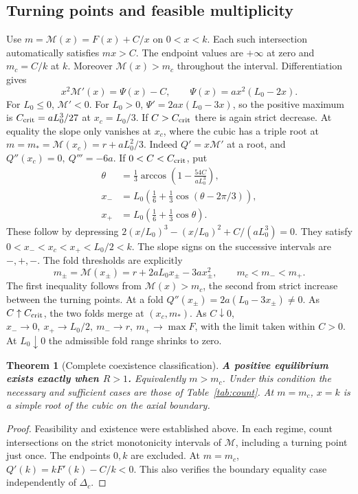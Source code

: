 \documentclass[12pt,a4paper,twoside,fleqn]{article}
\theoremstyle{journal}
\newtheorem{theorem}{Theorem}
\newcommand{\claim}[1]{{\normalfont\bfseries\boldmath #1}}
\begin{document}
\subsection{Turning points and feasible multiplicity}
Use \(m=\mathcal M(x)=F(x)+C/x\) on \(0<x<k\). Each such intersection automatically satisfies \(mx>C\). The endpoint values are \(+\infty\) at zero and \(m_c=C/k\) at \(k\). Moreover \(\mathcal M(x)>m_c\) throughout the interval. Differentiation gives
\[
 x^2\mathcal M'(x)=\Psi(x)-C,\qquad \Psi(x)=ax^2(L_0-2x).
\]
For \(L_0\le0\), \(\mathcal M'<0\). For \(L_0>0\), \(\Psi'=2ax(L_0-3x)\), so the positive maximum is \(C_{\rm crit}=aL_0^3/27\) at \(x_c=L_0/3\). If \(C>C_{\rm crit}\) there is again strict decrease. At equality the slope only vanishes at \(x_c\), where the cubic has a triple root at \(m=m_*=\mathcal M(x_c)=r+aL_0^2/3\). Indeed \(Q'=x\mathcal M'\) at a root, and \(Q''(x_c)=0,\ Q'''=-6a\). If \(0<C<C_{\rm crit}\), put
\[
 \begin{aligned}
 \theta&=\tfrac13\arccos\!\left(1-\frac{54C}{aL_0^3}\right),\\
 x_-&=L_0\left(\tfrac16+\tfrac13\cos(\theta-2\pi/3)\right),\\
 x_+&=L_0\left(\tfrac16+\tfrac13\cos\theta\right).
 \end{aligned}
\]
These follow by depressing \(2(x/L_0)^3-(x/L_0)^2+C/(aL_0^3)=0\). They satisfy \(0<x_-<x_c<x_+<L_0/2<k\). The slope signs on the successive intervals are \(-,+,-\). The fold thresholds are explicitly
\[
 m_\pm=\mathcal M(x_\pm)=r+2aL_0x_\pm-3ax_\pm^2,\qquad m_c<m_-<m_+ .
\]
The first inequality follows from \(\mathcal M(x)>m_c\), the second from strict increase between the turning points. At a fold \(Q''(x_\pm)=2a(L_0-3x_\pm)\ne0\). As \(C\uparrow C_{\rm crit}\), the two folds merge at \((x_c,m_*)\). As \(C\downarrow0\), \(x_-\to0,\ x_+\to L_0/2,\ m_-\to r,\ m_+\to\max F\), with the limit taken within \(C>0\). At \(L_0\downarrow0\) the admissible fold range shrinks to zero.

\begin{theorem}[Complete coexistence classification]\label{thm:roots}
\claim{A positive equilibrium exists exactly when \(R>1\).} Equivalently \(m>m_c\). Under this condition the necessary and sufficient cases are those of Table~\ref{tab:count}. At \(m=m_c\), \(x=k\) is a simple root of the cubic on the axial boundary.
\end{theorem}
\begin{proof}
Feasibility and existence were established above. In each regime, count intersections on the strict monotonicity intervals of \(\mathcal M\), including a turning point just once. The endpoints \(0,k\) are excluded. At \(m=m_c\), \(Q'(k)=kF'(k)-C/k<0\). This also verifies the boundary equality case independently of \(\Delta_c\).
\end{proof}
\end{document}
